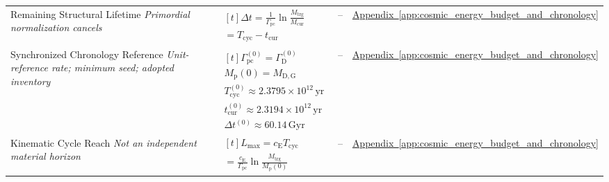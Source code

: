 \begin{longtable}{@{} p{4.5cm} p{6cm} c p{4cm} @{}}
{\raggedright Remaining Structural Lifetime \newline \textit{Primordial normalization cancels}\par} & {\raggedright $\begin{gathered}[t]\Delta t=\frac1{\Gamma_{\mathrm{pc}}}\ln\!\frac{M_{\mathrm{trg}}}{M_{\mathrm{cur}}} \\ =T_{\mathrm{cyc}}-t_{\mathrm{cur}}\end{gathered}$\par} & -- & {\raggedright \hyperref[app:cosmic_energy_budget_and_chronology]{Appendix~\ref*{app:cosmic_energy_budget_and_chronology}}\par} \\

{\raggedright Synchronized Chronology Reference \newline \textit{Unit-reference rate; minimum seed; adopted inventory}\par} & {\raggedright $\begin{gathered}[t]\Gamma_{\mathrm{pc}}^{(0)}=\Gamma_{\mathrm D}^{(0)} \\ M_{\mathrm p}(0)=M_{\mathrm{D,G}} \\ T_{\mathrm{cyc}}^{(0)}\approx2.3795\times10^{12}\,\mathrm{yr} \\ t_{\mathrm{cur}}^{(0)}\approx2.3194\times10^{12}\,\mathrm{yr} \\ \Delta t^{(0)}\approx60.14\,\mathrm{Gyr}\end{gathered}$\par} & -- & {\raggedright \hyperref[app:cosmic_energy_budget_and_chronology]{Appendix~\ref*{app:cosmic_energy_budget_and_chronology}}\par} \\

{\raggedright Kinematic Cycle Reach \newline \textit{Not an independent material horizon}\par} & {\raggedright $\begin{gathered}[t]L_{\max}=c_{\mathrm E}T_{\mathrm{cyc}} \\ =\frac{c_{\mathrm E}}{\Gamma_{\mathrm{pc}}}\ln\!\frac{M_{\mathrm{trg}}}{M_{\mathrm p}(0)}\end{gathered}$\par} & -- & {\raggedright \hyperref[app:cosmic_energy_budget_and_chronology]{Appendix~\ref*{app:cosmic_energy_budget_and_chronology}}\par} \\


\end{longtable}
